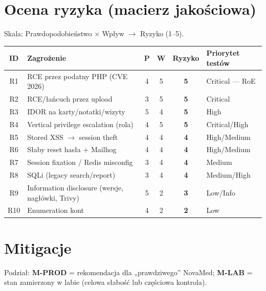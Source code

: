 \documentclass[11pt,a4paper]{article}
\begin{document}
\section{Ocena ryzyka (macierz jakościowa)}

Skala: Prawdopodobieństwo $\times$ Wpływ $\rightarrow$ Ryzyko (1–5).

\begin{tabularx}{\textwidth}{@{}c L c c c L@{}}
\toprule
\textbf{ID} & \textbf{Zagrożenie} & \textbf{P} & \textbf{W} & \textbf{Ryzyko} & \textbf{Priorytet testów} \\
\midrule
R1 & RCE przez podatny PHP (CVE 2026) & 4 & 5 & \textbf{5} & \textcolor{crit}{Critical — RoE} \\
R2 & RCE/łańcuch przez upload & 3 & 5 & \textbf{5} & \textcolor{crit}{Critical} \\
R3 & IDOR na karty/notatki/wizyty & 5 & 4 & \textbf{5} & \textcolor{high}{High} \\
R4 & Vertical privilege escalation (rola) & 4 & 5 & \textbf{5} & \textcolor{crit}{Critical/High} \\
R5 & Stored XSS $\rightarrow$ session theft & 4 & 4 & \textbf{4} & High/Medium \\
R6 & Słaby reset hasła + Mailhog & 4 & 4 & \textbf{4} & High/Medium \\
R7 & Session fixation / Redis misconfig & 3 & 4 & \textbf{4} & Medium \\
R8 & SQLi (legacy search/report) & 3 & 4 & \textbf{4} & Medium/High \\
R9 & Information disclosure (wersje, nagłówki, Trivy) & 5 & 2 & \textbf{3} & Low/Info \\
R10 & Enumeration kont & 4 & 2 & \textbf{2} & Low \\
\bottomrule
\end{tabularx}

\vspace{0.4em}

\section{Mitigacje}

Podział: \textbf{M-PROD} = rekomendacja dla „prawdziwego” NovaMed; \textbf{M-LAB} = stan zamierzony w labie (celowa słabość lub częściowa kontrola).
\end{document}
